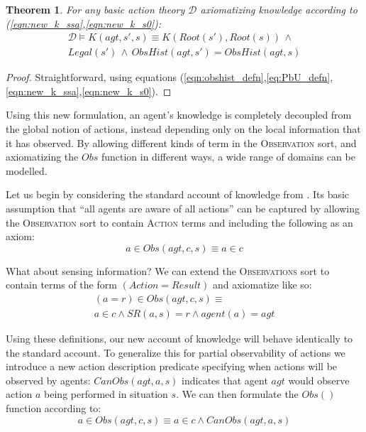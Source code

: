\documentclass{ifaamas-submission}
\newcommand{\noun}[1]{\textsc{#1}}
\newtheorem{theorem}{Theorem}
\begin{document}
\begin{theorem}
\label{thm:k_obs_equiv} For any basic action theory $\mathcal{D}$ axiomatizing
knowledge according to (\ref{eqn:new_k_ssa},\ref{eqn:new_k_s0}):
\begin{multline*}
\mathcal{D}\models K(agt,s',s)\equiv K(Root(s'),Root(s))\,\wedge\\
Legal(s')\,\wedge\, ObsHist(agt,s')=ObsHist(agt,s)
\end{multline*}
\end{theorem}
\begin{proof}
Straightforward, using equations (\ref{eqn:obshist_defn},\ref{eq:PbU_defn},\ref{eqn:new_k_ssa},\ref{eqn:new_k_s0}). 
\end{proof}

Using this new formulation, an agent's knowledge is completely decoupled
from the global notion of actions, instead depending only on the local
information that it has observed. By allowing different kinds of term in
the \noun{Observation} sort, and axiomatizing the $Obs$ function in
different ways, a wide range of domains can be modelled.

Let us begin by considering the standard account of knowledge from
\cite{scherl03sc_knowledge}. Its basic assumption that {}``all agents
are aware of all actions'' can be captured by allowing the \noun{Observation}
sort to contain \noun{Action} terms and including the following as an axiom:
\begin{equation}
a\in Obs(agt,c,s)\equiv a\in c\label{eq:ax_obs_std1}
\end{equation}

What about sensing information? We can extend the \noun{Observations}
sort to contain terms of the form \emph{$(Action=Result)$} and axiomatize
like so:
\begin{multline}
(a=r)\in Obs(agt,c,s)\equiv\\
a\in c\wedge SR(a,s)=r\wedge agent(a)=agt\label{eq:ax_obs_std2}
\end{multline}


Using these definitions, our new account of knowledge will behave
identically to the standard account.
To generalize this for partial observability of actions we introduce
a new action description predicate specifying
when actions will be observed by agents: $CanObs(agt,a,s)$ indicates
that agent $agt$ would observe action $a$ being performed in situation
$s$. We can then formulate the $Obs()$ function according
to:
\begin{equation*}
a\in Obs(agt,c,s)\equiv a\in c\wedge CanObs(agt,a,s)
\end{equation*}
\end{document}
